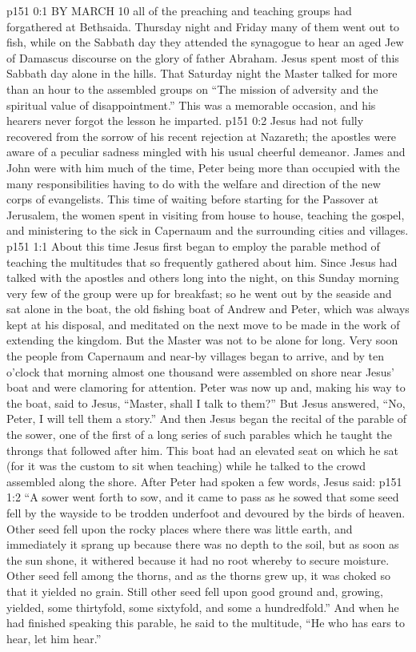 \vs p151 0:1 BY MARCH 10 all of the preaching and teaching groups had forgathered at Bethsaida. Thursday night and Friday many of them went out to fish, while on the Sabbath day they attended the synagogue to hear an aged Jew of Damascus discourse on the glory of father Abraham. Jesus spent most of this Sabbath day alone in the hills. That Saturday night the Master talked for more than an hour to the assembled groups on “The mission of adversity and the spiritual value of disappointment.” This was a memorable occasion, and his hearers never forgot the lesson he imparted.
\vs p151 0:2 Jesus had not fully recovered from the sorrow of his recent rejection at Nazareth; the apostles were aware of a peculiar sadness mingled with his usual cheerful demeanor. James and John were with him much of the time, Peter being more than occupied with the many responsibilities having to do with the welfare and direction of the new corps of evangelists. This time of waiting before starting for the Passover at Jerusalem, the women spent in visiting from house to house, teaching the gospel, and ministering to the sick in Capernaum and the surrounding cities and villages.
\vs p151 1:1 About this time Jesus first began to employ the parable method of teaching the multitudes that so frequently gathered about him. Since Jesus had talked with the apostles and others long into the night, on this Sunday morning very few of the group were up for breakfast; so he went out by the seaside and sat alone in the boat, the old fishing boat of Andrew and Peter, which was always kept at his disposal, and meditated on the next move to be made in the work of extending the kingdom. But the Master was not to be alone for long. Very soon the people from Capernaum and near\hyp{}by villages began to arrive, and by ten o’clock that morning almost one thousand were assembled on shore near Jesus’ boat and were clamoring for attention. Peter was now up and, making his way to the boat, said to Jesus, “Master, shall I talk to them?” But Jesus answered, “No, Peter, I will tell them a story.” And then Jesus began the recital of the parable of the sower, one of the first of a long series of such parables which he taught the throngs that followed after him. This boat had an elevated seat on which he sat (for it was the custom to sit when teaching) while he talked to the crowd assembled along the shore. After Peter had spoken a few words, Jesus said:
\vs p151 1:2 \pc \textcolor{ubdarkred}{“A sower went forth to sow, and it came to pass as he sowed that some seed fell by the wayside to be trodden underfoot and devoured by the birds of heaven. Other seed fell upon the rocky places where there was little earth, and immediately it sprang up because there was no depth to the soil, but as soon as the sun shone, it withered because it had no root whereby to secure moisture. Other seed fell among the thorns, and as the thorns grew up, it was choked so that it yielded no grain. Still other seed fell upon good ground and, growing, yielded, some thirtyfold, some sixtyfold, and some a hundredfold.” And when he had finished speaking this parable, he said to the multitude, “He who has ears to hear, let him hear.”}
